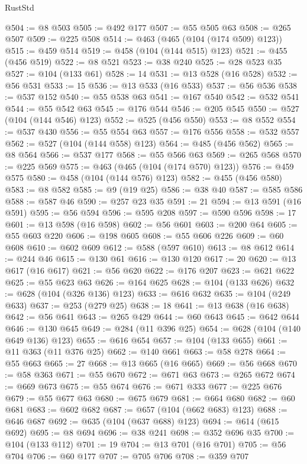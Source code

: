 \begin{lexlean}{RustStd}
\begin{coremodule}
@504 := @8 @503
@505 := @492 @177
@507 := @55 @505 @63
@508 := @265 @507
@509 := @225 @508
@514 := @463 (@465 (@104 (@174 @509) @123))
@515 := @459 @514
@519 := @458 (@104 (@144 @515) @123)
@521 := @455 (@456 @519)
@522 := @8 @521
@523 := @38 @240
@525 := @28 @523 @35
@527 := @104 (@133 @61)
@528 := 14
@531 := @13 @528 (@16 @528)
@532 := @56 @531
@533 := 15
@536 := @13 @533 (@16 @533)
@537 := @56 @536
@538 := @537 @152
@540 := @55 @538 @63
@541 := @167 @540
@542 := @532 @541
@544 := @55 @542 @63
@545 := @176 @544
@546 := @205 @545
@550 := @527 (@104 (@144 @546) @123)
@552 := @525 (@456 @550)
@553 := @8 @552
@554 := @537 @430
@556 := @55 @554 @63
@557 := @176 @556
@558 := @532 @557
@562 := @527 (@104 (@144 @558) @123)
@564 := @485 (@456 @562)
@565 := @8 @564
@566 := @537 @177
@568 := @55 @566 @63
@569 := @265 @568
@570 := @225 @569
@575 := @463 (@465 (@104 (@174 @570) @123))
@576 := @459 @575
@580 := @458 (@104 (@144 @576) @123)
@582 := @455 (@456 @580)
@583 := @8 @582
@585 := @9 (@19 @25)
@586 := @38 @40
@587 := @585 @586
@588 := @587 @46
@590 := @257 @23 @35
@591 := 21
@594 := @13 @591 (@16 @591)
@595 := @56 @594
@596 := @595 @208
@597 := @590 @596
@598 := 17
@601 := @13 @598 (@16 @598)
@602 := @56 @601
@603 := @200 @64
@605 := @55 @603 @220
@606 := @198 @605
@608 := @55 @606 @226
@609 := @60 @608
@610 := @602 @609
@612 := @588 (@597 @610)
@613 := @8 @612
@614 := @244 @46
@615 := @130 @61
@616 := @130 @120
@617 := 20
@620 := @13 @617 (@16 @617)
@621 := @56 @620
@622 := @176 @207
@623 := @621 @622
@625 := @55 @623 @63
@626 := @164 @625
@628 := @104 (@133 @626)
@632 := @628 (@104 (@326 @136) @123)
@633 := @616 @632
@635 := @104 (@249 @633)
@637 := @253 (@279 @25)
@638 := 18
@641 := @13 @638 (@16 @638)
@642 := @56 @641
@643 := @265 @429
@644 := @60 @643
@645 := @642 @644
@646 := @130 @645
@649 := @284 (@11 @396 @25)
@654 := @628 (@104 (@140 @649 @136) @123)
@655 := @616 @654
@657 := @104 (@133 @655)
@661 := @11 @363 (@11 @376 @25)
@662 := @140 @661
@663 := @58 @278
@664 := @55 @663
@665 := 27
@668 := @13 @665 (@16 @665)
@669 := @56 @668
@670 := @58 @363
@671 := @55 @670
@672 := @671 @63
@673 := @265 @672
@674 := @669 @673
@675 := @55 @674
@676 := @671 @333
@677 := @225 @676
@679 := @55 @677 @63
@680 := @675 @679
@681 := @664 @680
@682 := @60 @681
@683 := @602 @682
@687 := @657 (@104 (@662 @683) @123)
@688 := @646 @687
@692 := @635 (@104 (@637 @688) @123)
@694 := @614 (@615 @692)
@695 := @8 @694
@696 := @38 @241
@698 := @352 @696 @35
@700 := @104 (@133 @112)
@701 := 19
@704 := @13 @701 (@16 @701)
@705 := @56 @704
@706 := @60 @177
@707 := @705 @706
@708 := @359 @707

\end{coremodule}
\end{lexlean}
